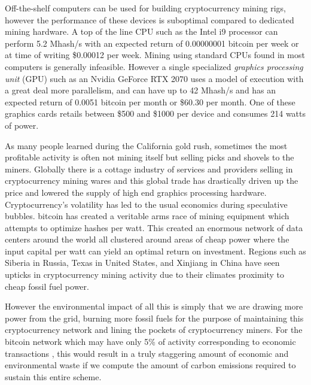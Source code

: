 
Off-the-shelf computers can be used for building cryptocurrency mining
rigs, however the performance of these devices is suboptimal compared to
dedicated mining hardware. A top of the line CPU such as the Intel i9
processor can perform 5.2 Mhash/s with an expected return of 0.00000001
bitcoin per week or at time of writing \$0.00012 per week. Mining using
standard CPUs found in most computers is generally infeasible. However a
single specialized \textit{graphics processing unit} (GPU) such as an Nvidia
GeForce RTX 2070 uses a model of execution with a great deal more
parallelism, and can have up to 42 Mhash/s and has an expected return of
0.0051 bitcoin per month or \$60.30 per month. One of these graphics
cards retails between \$500 and \$1000 per device and consumes 214 watts
of power.


As many people learned during the California gold rush, sometimes the most
profitable activity is often not mining itself but selling picks and shovels to
the miners. Globally there is a cottage industry of services and providers
selling in cryptocurrency mining wares and this global trade has drastically
driven up the price and lowered the supply of high end graphics processing
hardware. Cryptocurrency's volatility has led to the usual economics during
speculative bubbles. bitcoin has created a veritable arms race of mining
equipment which attempts to optimize hashes per watt. This created an enormous
network of data centers around the world all clustered around areas of cheap
power where the input capital per watt can yield an optimal return on
investment.  Regions such as Siberia in Russia, Texas in United States, and
Xinjiang in China have seen upticks in cryptocurrency mining activity due to
their climates proximity to cheap fossil fuel power.


However the environmental impact of all this is simply that we are drawing more
power from the grid, burning more fossil fuels for the purpose of maintaining
this cryptocurrency network and lining the pockets of cryptocurrency miners. For
the bitcoin network which may have only 5\% of activity corresponding to
economic transactions \cite{vigna_most_2019} , this would result in a truly
staggering amount of economic and environmental waste if we compute the amount
of carbon emissions required to sustain this entire scheme.

